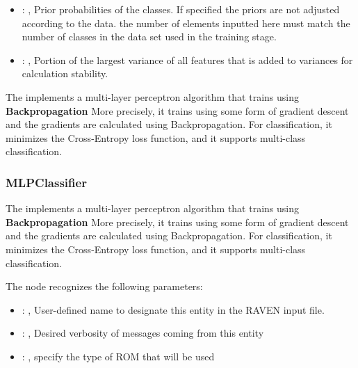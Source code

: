 \begin{itemize}
    \item {}: , 
      Prior probabilities of the classes. If specified the priors are
      not adjusted according to the data. \nb the number of elements inputted here must
      match the number of classes in the data set used in the training stage.

    \item {}: , 
      Portion of the largest variance of all features that is added to variances for
      calculation stability.
  \end{itemize}
 The  implements a multi-layer perceptron algorithm that trains using
 \textbf{Backpropagation}                             More precisely, it trains using some form of
 gradient descent and the gradients are calculated using Backpropagation.
 For classification, it minimizes the Cross-Entropy loss function, and it supports multi-class
 classification.                             

\subsubsection{MLPClassifier}
  The  implements a multi-layer perceptron algorithm that trains using
  \textbf{Backpropagation}                             More precisely, it trains using some form of
  gradient descent and the gradients are calculated using Backpropagation.
  For classification, it minimizes the Cross-Entropy loss function, and it supports multi-class
  classification.                             

  The  node recognizes the following parameters:
    \begin{itemize}
      \item {}: , 
        User-defined name to designate this entity in the RAVEN input file.
      \item {}: , 
        Desired verbosity of messages coming from this entity
      \item {}: , 
        specify the type of ROM that will be used
  \end{itemize}

